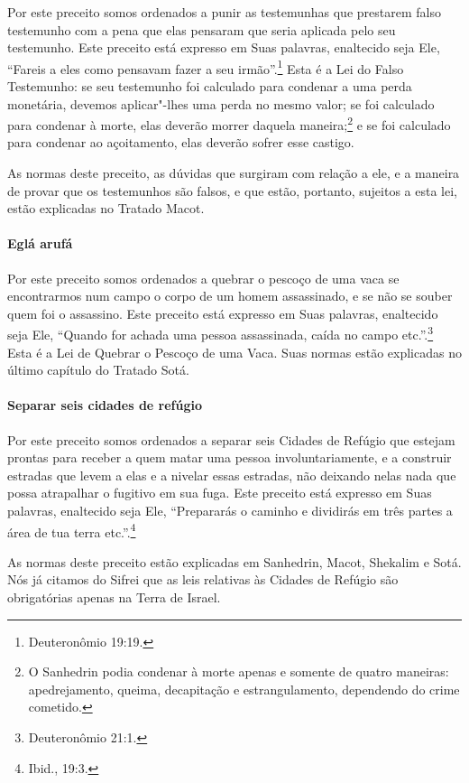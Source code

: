 \begin{multicols}{2}
Por este preceito somos ordenados a punir as testemunhas que prestarem
falso testemunho com a pena que elas pensaram que seria aplicada pelo
seu testemunho. Este preceito está expresso em Suas palavras, enaltecido
seja Ele, ``Fareis a eles como pensavam fazer a seu irmão''.\footnote{Deuteronômio 19:19.} Esta é a Lei do Falso Testemunho: se seu
testemunho foi calculado para condenar a uma perda monetária, devemos aplicar"-lhes uma perda no mesmo valor;
se foi calculado para condenar à morte, elas deverão morrer daquela
maneira;\footnote{O Sanhedrin\starr{} podia condenar à morte apenas e somente de quatro
maneiras: apedrejamento, queima, decapitação e estrangulamento,
dependendo do crime cometido.}
e se foi calculado para condenar ao açoitamento, elas deverão sofrer
esse castigo.

As normas deste preceito, as dúvidas que surgiram com relação a ele, e a
maneira de provar que os testemunhos são falsos, e que estão, portanto,
sujeitos a esta lei, estão explicadas no Tratado Macot\starr.


\paragraph{Eglá arufá\starr}

Por este preceito somos ordenados a quebrar o pescoço de uma vaca se
encontrarmos num campo o corpo de um homem assassinado, e se não se
souber quem foi o assassino. Este preceito está expresso em Suas
palavras, enaltecido seja Ele, ``Quando for achada uma pessoa
assassinada, caída no campo etc.''.\footnote{Deuteronômio 21:1.} Esta é a Lei de
Quebrar o Pescoço de uma Vaca. Suas normas estão explicadas no último
capítulo do Tratado Sotá\starr.

\paragraph{Separar seis cidades de refúgio}

Por este preceito somos ordenados a separar seis Cidades de Refúgio que
estejam prontas para receber a quem matar uma pessoa involuntariamente,
e a construir estradas que levem a elas e a nivelar essas estradas, não
deixando nelas nada que possa atrapalhar o fugitivo em sua fuga. Este
preceito está expresso em Suas palavras, enaltecido seja Ele,
``Prepararás o caminho e dividirás em três partes a área de tua terra
etc.''.\footnote{Ibid., 19:3.}

As normas deste preceito estão explicadas em Sanhedrin\starr, Macot\starr, Shekalim\starr{}
e Sotá\starr. Nós já citamos do Sifrei\starr{} que as leis relativas às Cidades de
Refúgio são obrigatórias apenas na Terra de Israel.


\end{multicols}
